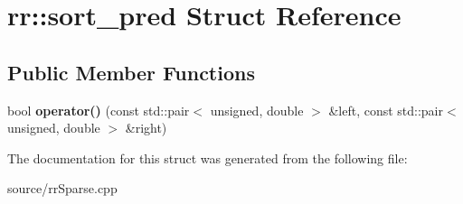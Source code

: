 \hypertarget{structrr_1_1sort__pred}{\section{rr\-:\-:sort\-\_\-pred Struct Reference}
\label{structrr_1_1sort__pred}
}
\subsection*{Public Member Functions}
\begin{DoxyCompactItemize}
\item 
\hypertarget{structrr_1_1sort__pred_ac4c28257b4431772a322b1e9d0d57985}{bool {\bfseries operator()} (const std\-::pair$<$ unsigned, double $>$ \&left, const std\-::pair$<$ unsigned, double $>$ \&right)}\label{structrr_1_1sort__pred_ac4c28257b4431772a322b1e9d0d57985}

\end{DoxyCompactItemize}


The documentation for this struct was generated from the following file\-:\begin{DoxyCompactItemize}
\item 
source/rr\-Sparse.\-cpp\end{DoxyCompactItemize}
